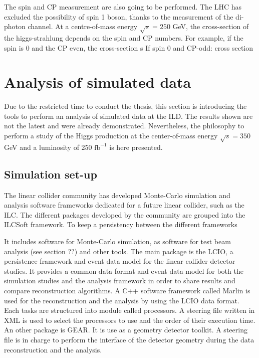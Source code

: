     The spin and CP measurement are also going to be performed. 
    The LHC has excluded the possibility of spin 1 boson, thanks to the measurement of the di-photon channel. 
    At a centre-of-mass energy $\sqrt{s} = 250$ GeV, the cross-section of the higgs-strahlung depends on the spin and CP numbers.
    For example, if the spin is 0 and the CP even, the cross-section s
    If spin 0 and CP-odd: cross section

  \section{Analysis of simulated data}
  
    Due to the restricted time to conduct the thesis, this section is introducing the tools to perform an analysis of simulated data at the ILD. 
    The results shown are not the latest and were already demonstrated. 
    Nevertheless, the philosophy to perform a study of the Higgs production at the center-of-mass energy $\sqrt{s} = 350$ GeV and a luminosity of 250 $\text{fb}^{-1}$ is here presented.
  
  \subsection{Simulation set-up}  
  \label{subsec:ILCSOFT}
  
    The linear collider community has developed Monte-Carlo simulation and analysis software frameworks dedicated for a future linear collider, such as the \gls{ILC}. 
    The different packages developed by the community are grouped into the ILCSoft framework\cite{ilcsoft}.
    To keep a persistency between the different frameworks
    
    It includes software for Monte-Carlo simulation, as software for test beam analysis (see section ??) and other tools.
    The main package is the \gls{LCIO}, a persistence framework and event data model for the linear collider detector studies\cite{lcio}. 
    It provides a common data format and event data model for both the simulation studies and the analysis framework in order to share results and compare reconstruction algorithms.
    A C++ software framework called \gls{Marlin} is used for the reconstruction and the analysis by using the \gls{LCIO} data format.
    Each tasks are structured into module called processors. 
    A steering file written in XML is used to select the processors to use and the order of their execution time.
    An other package is \gls{GEAR}.
    It is use as a geometry detector toolkit.
    A steering file is in charge to perform the interface of the detector geometry during the data reconstruction and the analysis.

